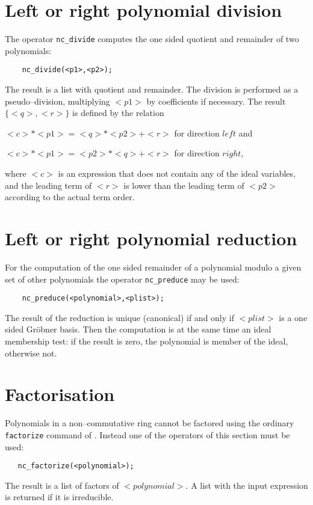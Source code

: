 \section{Left or right polynomial division}

The operator {\tt nc\_divide} computes the one
sided quotient and remainder of two polynomials:
\begin{verbatim}
    nc_divide(<p1>,<p2>);
\end{verbatim}
The result is a list with quotient and remainder.
The division is performed as a pseudo--division, multiplying
$<p1>$ by coefficients if necessary. The result $\{<q>,<r>\}$
is defined by the relation

  $<c>*<p1>=<q>*<p2> + <r>$ for direction $left$ and

  $<c>*<p1>=<p2>*<q> + <r>$ for direction $right$,

where $<c>$ is an expression that does not contain any of the
ideal variables, and the leading term of $<r>$ is lower than
the leading term of $<p2>$ according to the actual term order.

\section{Left or right polynomial reduction}

For the computation of the one sided remainder of a polynomial
modulo a given set of other polynomials the operator
{\tt nc\_preduce} may be used:
\begin{verbatim}
    nc_preduce(<polynomial>,<plist>);
\end{verbatim}
The result of the reduction is unique (canonical) if
and only if $<plist>$ is a one sided Gr\"obner basis.
Then the computation is at the same time an ideal
membership test: if the result is zero, the
polynomial is member of the ideal, otherwise not.

\section{Factorisation}

Polynomials in a non--commutative ring cannot be factored
using the ordinary {\tt factorize} command of \REDUCE.
Instead one of the operators of this section must be
used:
\begin{verbatim}
   nc_factorize(<polynomial>);
\end{verbatim}
The result is a list of factors of $<polynomial>$. A list
with the input expression is returned if it is irreducible.

